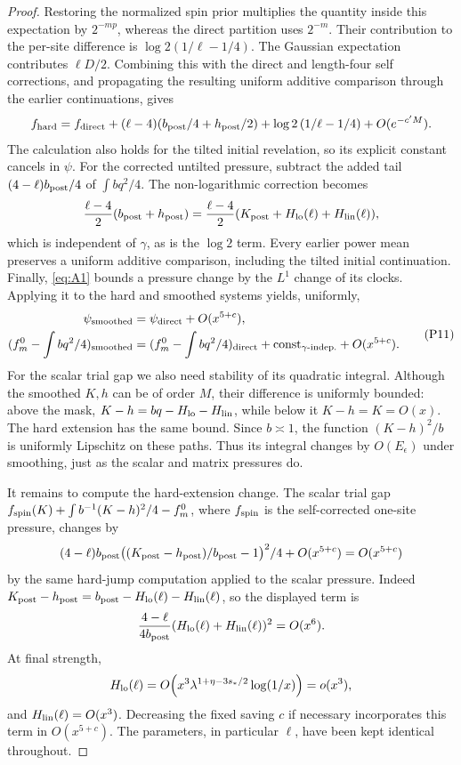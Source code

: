 \begin{proof}
Restoring the normalized spin prior multiplies the quantity inside this
expectation by \(2^{-mp}\), whereas the direct partition uses
\(2^{-m}\). Their contribution to the per-site difference is
\(\log2(1/\ell-1/4)\). The Gaussian expectation contributes
\(\ell D/2\). Combining this with the direct and length-four self
corrections, and propagating the resulting uniform additive comparison
through the earlier continuations, gives
\[
 f_{\rm hard}= f_{\rm direct}
      +(\ell-4)(b_{\rm post}/4+h_{\rm post}/2)
      +\log2\,(1/\ell-1/4)+O(e^{-c'M}).
\]
The calculation also holds for the tilted initial revelation, so its
explicit constant cancels in \(\psi\). For the corrected untilted
pressure, subtract the added tail \((4-\ell)b_{\rm post}/4\) of
\(\int bq^2/4\). The non-logarithmic correction becomes
\[
 \frac{\ell-4}{2}(b_{\rm post}+h_{\rm post})
 =\frac{\ell-4}{2}
   (K_{\rm post}+H_{\rm lo}(\ell)+H_{\rm lin}(\ell)),
\]
which is independent of \(\gamma\), as is the \(\log2\) term.
Every earlier power mean preserves a uniform additive comparison,
including the tilted initial continuation. Finally, \eqref{eq:A1}
bounds a pressure change by the \(L^1\) change of its clocks.
Applying it to the hard and smoothed systems yields,
uniformly,
\[
\begin{split}
 \psi_{\rm smoothed}&=\psi_{\rm direct}+O(x^{5+c}),\\
 (f_m^0-\int bq^2/4)_{\rm smoothed}
   &=(f_m^0-\int bq^2/4)_{\rm direct}
       +\mathrm{const}_{\gamma\text{-indep.}}+O(x^{5+c}).
\end{split}                                                          \tag{P11}\label{eq:P11}
\]
For the scalar trial gap we also need stability of its quadratic
integral. Although the smoothed \(K,h\) can be of order \(M\),
their difference is uniformly bounded: above the mask,
\(K-h=bq-H_{\rm lo}-H_{\rm lin}\), while below it
\(K-h=K=O(x)\). The hard extension has the same bound.
Since \(b\asymp1\), the function \((K-h)^2/b\) is uniformly
Lipschitz on these paths. Thus its integral changes by
\(O(E_\epsilon)\) under smoothing, just as the scalar and matrix
pressures do.

It remains to compute the hard-extension change. The scalar trial gap
\(f_{\rm spin}(K)+\int b^{-1}(K-h)^2/4-f_m^0\), where \(f_{\rm spin}\) is the self-corrected one-site pressure, changes by
\[
 (4-\ell)b_{\rm post}\big((K_{\rm post}-h_{\rm post})/b_{\rm post}-1\big)^2/4
       +O(x^{5+c})=O(x^{5+c})
\]
by the same hard-jump computation applied to the scalar pressure.
Indeed \(K_{\rm post}-h_{\rm post}=b_{\rm post}
-H_{\rm lo}(\ell)-H_{\rm lin}(\ell)\), so the displayed term is
\[
 \frac{4-\ell}{4b_{\rm post}}
       (H_{\rm lo}(\ell)+H_{\rm lin}(\ell))^2=O(x^6).
\]
At final strength,
\[
 H_{\rm lo}(\ell)
 =O\!\left(x^3\lambda^{1+\eta-3s_*/2}\log(1/x)\right)=o(x^3),
\]
and
\(H_{\rm lin}(\ell)=O(x^3)\). Decreasing the fixed saving \(c\)
if necessary incorporates this term in \(O(x^{5+c})\). The parameters,
in particular \(\ell\), have been kept identical throughout.

\end{proof}
